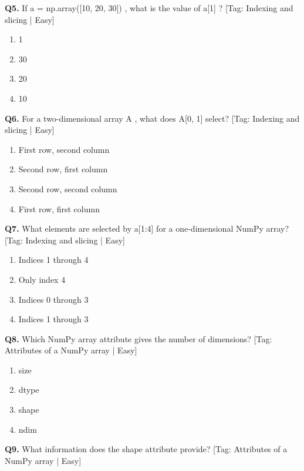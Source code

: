 \vspace{2mm}
\noindent\textbf{Q5.} If a = np.array([10, 20, 30]) , what is the value of a[1] ? \hfill [Tag: Indexing and slicing | Easy]
\begin{enumerate}[label=(\alph*),topsep=2pt,itemsep=1pt,partopsep=0pt,parsep=0pt]
    \item {1}
    \item {30}
    \item {20}
    \item {10}
\end{enumerate}
\vspace{2mm}
\noindent\textbf{Q6.} For a two-dimensional array A , what does A[0, 1] select? \hfill [Tag: Indexing and slicing | Easy]
\begin{enumerate}[label=(\alph*),topsep=2pt,itemsep=1pt,partopsep=0pt,parsep=0pt]
    \item {First row, second column}
    \item {Second row, first column}
    \item {Second row, second column}
    \item {First row, first column}
\end{enumerate}
\vspace{2mm}
\noindent\textbf{Q7.} What elements are selected by a[1:4] for a one-dimensional NumPy array? \hfill [Tag: Indexing and slicing | Easy]
\begin{enumerate}[label=(\alph*),topsep=2pt,itemsep=1pt,partopsep=0pt,parsep=0pt]
    \item {Indices 1 through 4}
    \item {Only index 4}
    \item {Indices 0 through 3}
    \item {Indices 1 through 3}
\end{enumerate}
\vspace{2mm}
\noindent\textbf{Q8.} Which NumPy array attribute gives the number of dimensions? \hfill [Tag: Attributes of a NumPy array | Easy]
\begin{enumerate}[label=(\alph*),topsep=2pt,itemsep=1pt,partopsep=0pt,parsep=0pt]
    \item {size}
    \item {dtype}
    \item {shape}
    \item {ndim}
\end{enumerate}
\vspace{2mm}
\noindent\textbf{Q9.} What information does the shape attribute provide? \hfill [Tag: Attributes of a NumPy array | Easy]
